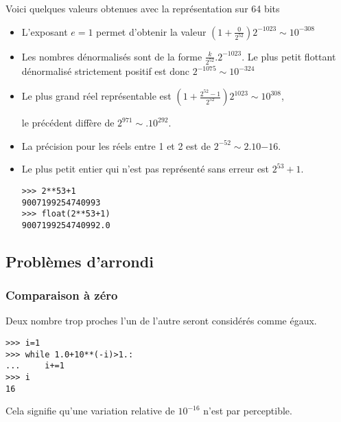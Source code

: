 Voici quelques valeurs obtenues avec la représentation sur 64 bits
\begin{itemize}
    \item L'exposant $e=1$ permet d'obtenir la valeur $\displaystyle \left(1+\frac 0{2^{52}}\right)2^{-1023}\sim 10^{-308}$
    \item Les nombres dénormalisés sont de la forme $\displaystyle \frac k{2^{52}}.2^{-1023}$. Le plus petit flottant dénormalisé strictement positif est donc $2^{-1075}\sim 10^{-324}$
    \item Le plus grand réel représentable est $\displaystyle \left(1+\frac {2^{52}-1}{2^{52}}\right)2^{1023}\sim 10^{308}$, 
    
    le précédent diffère de $2^{971}\sim.10^{292}$.
    \item La précision pour les réels entre 1 et 2 est de $2^{-52}\sim 2.10{-16}$.
    \item Le plus petit entier qui n'est pas représenté sans erreur est $2^{53}+1$.
\begin{lstlisting}
>>> 2**53+1
9007199254740993
>>> float(2**53+1)
9007199254740992.0
\end{lstlisting}
\end{itemize}
\subsection{Problèmes d'arrondi}

\subsubsection{Comparaison à zéro}
Deux nombre trop proches l'un de l'autre seront considérés comme égaux.
\begin{lstlisting}
>>> i=1
>>> while 1.0+10**(-i)>1.:
...     i+=1
>>> i
16
\end{lstlisting}
Cela signifie qu'une variation relative de $10^{-16}$ n'est par perceptible.

